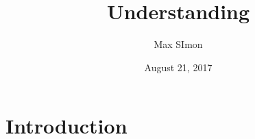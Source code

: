 \documentclass[
12pt, %
parskip=half, %
digital, %
oneside, %
]{bsc}
\title{Understanding}
\author{Max SImon}
\date{August 21, 2017}
\begin{document}
	
\chapter{Introduction}


\end{document}
